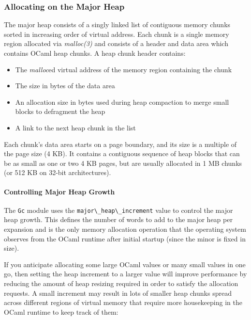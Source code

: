 \hypertarget{allocating-on-the-major-heap}{%
\subsubsection{Allocating on the Major
Heap}\label{allocating-on-the-major-heap}}

The major heap consists of a singly linked list of contiguous memory
chunks sorted in increasing order of virtual address. Each chunk is a
single memory region allocated via \emph{malloc(3)} and consists of a
header and data area which contains OCaml heap chunks. A heap chunk
header contains: 

\begin{itemize}
\item
  The \emph{malloc}ed virtual address of the memory region containing
  the chunk
\item
  The size in bytes of the data area
\item
  An allocation size in bytes used during heap compaction to merge small
  blocks to defragment the heap
\item
  A link to the next heap chunk in the list
\end{itemize}

Each chunk's data area starts on a page boundary, and its size is a
multiple of the page size (4 KB). It contains a contiguous sequence of
heap blocks that can be as small as one or two 4 KB pages, but are
usually allocated in 1 MB chunks (or 512 KB on 32-bit architectures).

\hypertarget{controlling-major-heap-growth}{%
\paragraph{Controlling Major Heap
Growth}\label{controlling-major-heap-growth}}

The \passthrough{\lstinline!Gc!} module uses the
\passthrough{\lstinline!major\_heap\_increment!} value to control the
major heap growth. This defines the number of words to add to the major
heap per expansion and is the only memory allocation operation that the
operating system observes from the OCaml runtime after initial startup
(since the minor is fixed in size).

If you anticipate allocating some large OCaml values or many small
values in one go, then setting the heap increment to a larger value will
improve performance by reducing the amount of heap resizing required in
order to satisfy the allocation requests. A small increment may result
in lots of smaller heap chunks spread across different regions of
virtual memory that require more housekeeping in the OCaml runtime to
keep track of them:

